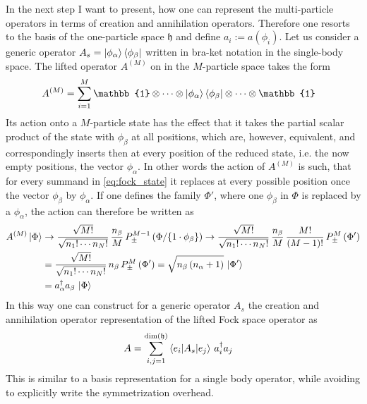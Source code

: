 In the next step I want to present, how one can represent the multi-particle operators in terms of creation and annihilation operators. Therefore one resorts to the basis of the one-particle space $\mathfrak{h}$ and define $a_i:=a(\phi_i)$. Let us consider a generic operator $A_s=\ket{\phi_\alpha}\bra{\phi_\beta}$ written in bra-ket notation in the single-body space. The lifted operator $A^{(M)}$ on  in the $M$-particle space takes the form
\begin{align*}
    A^{(M)}&=\sum_{i=1}^M \mathbb{1}\otimes\cdots\otimes \ket{\phi_\alpha}\bra{\phi_\beta}\otimes\cdots\otimes\mathbb{1}
\end{align*}
Its action onto a $M$-particle state has the effect that it takes the partial scalar product of the state with $\phi_\beta$ at all positions, which are, however, equivalent, and correspondingly inserts then at every position of the reduced state, i.e. the now empty positions, the vector $\phi_\alpha$. In other words the action of $A^{(M)}$ is such, that for every summand in \eqref{eq:fock_state} it replaces at every possible position once the vector $\phi_\beta$ by $\phi_\alpha$. If one defines the family $\Phi'$, where one $\phi_\beta$ in $\Phi$ is replaced by a $\phi_\alpha$, the action can therefore be written as 
\begin{align*}
    A^{(M)}\ket{\Phi}&\rightarrow\frac{\sqrt{M!}}{\sqrt{n_1!\cdots n_N!}}\,\frac{n_\beta}{M}\,P_\pm^{M-1}\left( \Phi/\{1\cdot\phi_\beta\}\right)\rightarrow \frac{\sqrt{M!}}{\sqrt{n_1!\cdots n_N!}}\,\frac{n_\beta}{M}\,\frac{M!}{(M-1)!}\,P_\pm^{M}\left( \Phi'\right)\\
    &=\frac{\sqrt{M!}}{\sqrt{n_1!\cdots n_N!}}\,{n_\beta}\,P_\pm^{M}\left( \Phi'\right)=\sqrt{n_\beta\,(n_\alpha+1)}\,\ket{\Phi'}\\
    &=a_\alpha^\dagger a_\beta\,\ket{\Phi}
\end{align*}
In this way one can construct for a generic operator $A_s$ the creation and annihilation operator representation of the lifted Fock space operator as
\begin{align}\label{eq:fock_single_body}
    A&=\sum_{i,j=1}^{\text{dim}(\mathfrak{h})}\braket{e_i|A_s|e_j}\,a_i^\dagger a_j
\end{align}
This is similar to a basis representation for a single body operator, while avoiding to explicitly write the symmetrization overhead. 

